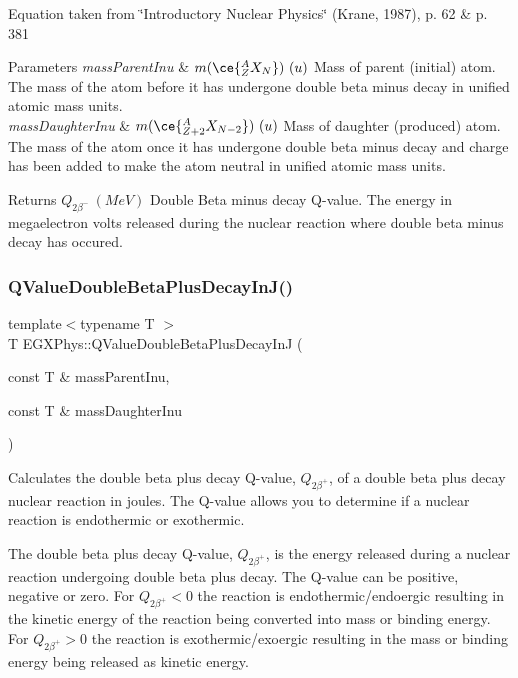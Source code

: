 Equation taken from \char`\"{}\+Introductory Nuclear Physics\char`\"{} (Krane, 1987), p. 62 \& p. 381


\begin{DoxyParams}{Parameters}
{\em mass\+Parent\+Inu} & $m(\ce{ ^{A}_{Z}X_{N} })\ (u)$ Mass of parent (initial) atom. The mass of the atom before it has undergone double beta minus decay in unified atomic mass units. \\
\hline
{\em mass\+Daughter\+Inu} & $m(\ce{ ^{A}_{Z{+2}}X_{N-2} })\ (u)$ Mass of daughter (produced) atom. The mass of the atom once it has undergone double beta minus decay and charge has been added to make the atom neutral in unified atomic mass units. \\
\hline
\end{DoxyParams}
\begin{DoxyReturn}{Returns}
$Q_{2\beta^-}\ (MeV)$ Double Beta minus decay Q-\/value. The energy in megaelectron volts released during the nuclear reaction where double beta minus decay has occured. 
\end{DoxyReturn}
\mbox{\label{group___q_value_ga7d8dcc2691c2d4de9132e758e149ba51}} 
\subsubsection{\texorpdfstring{Q\+Value\+Double\+Beta\+Plus\+Decay\+In\+J()}{QValueDoubleBetaPlusDecayInJ()}}
{\footnotesize\ttfamily template$<$typename T $>$ \\
T E\+G\+X\+Phys\+::\+Q\+Value\+Double\+Beta\+Plus\+Decay\+InJ (\begin{DoxyParamCaption}\item[{const T \&}]{mass\+Parent\+Inu,  }\item[{const T \&}]{mass\+Daughter\+Inu }\end{DoxyParamCaption})}



Calculates the double beta plus decay Q-\/value, $Q_{2\beta^+}$, of a double beta plus decay nuclear reaction in joules. The Q-\/value allows you to determine if a nuclear reaction is endothermic or exothermic. 

The double beta plus decay Q-\/value, $Q_{2\beta^+}$, is the energy released during a nuclear reaction undergoing double beta plus decay. The Q-\/value can be positive, negative or zero. For $Q_{2\beta^+} < 0$ the reaction is endothermic/endoergic resulting in the kinetic energy of the reaction being converted into mass or binding energy. For $Q_{2\beta^+} > 0$ the reaction is exothermic/exoergic resulting in the mass or binding energy being released as kinetic energy.

